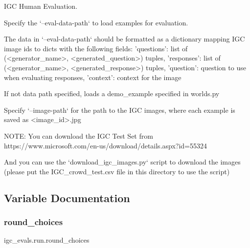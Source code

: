 \begin{DoxyVerb}IGC Human Evaluation.

Specify the `--eval-data-path` to load examples for evaluation.

The data in `--eval-data-path` should be formatted as a dictionary
mapping IGC image ids to dicts with the following fields:
{
    'questions': list of (<generator_name>, <generated_question>) tuples,
    'responses': list of (<generator_name>, <generated_response>) tuples,
    'question': question to use when evaluating responses,
    'context': context for the image
}

If not data path specified, loads a demo_example specified in worlds.py

Specify `--image-path` for the path to the IGC images, where each example
is saved as <image_id>.jpg


NOTE: You can download the IGC Test Set from
    https://www.microsoft.com/en-us/download/details.aspx?id=55324

And you can use the `download_igc_images.py` script to download the images
(please put the IGC_crowd_test.csv file in this directory to use the script)
\end{DoxyVerb}
 

\subsection{Variable Documentation}
\mbox{\label{namespaceigc__evals_1_1run_a8d800bb89949fff41662851f88503919}} 
\subsubsection{\texorpdfstring{round\+\_\+choices}{round\_choices}}
{\footnotesize\ttfamily igc\+\_\+evals.\+run.\+round\+\_\+choices}

